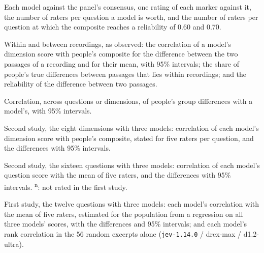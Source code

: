 \begin{table}[H]\centering
\caption{Each model against the panel's consensus, one rating of each marker against it, the number of raters
per question a model is worth, and the number of raters per question at which the composite reaches a
reliability of 0.60 and 0.70.}\label{tab:s2panel}

\end{table}

\begin{table}[H]\centering
\caption{Within and between recordings, as observed: the correlation of a model's dimension score with people's
composite for the difference between the two passages of a recording and for their mean, with 95\% intervals;
the share of people's true differences between passages that lies within recordings; and the reliability of
the difference between two passages.}\label{tab:s2within}

\end{table}

\begin{table}[H]\centering
\caption{Correlation, across questions or dimensions, of people's group differences with a model's, with 95\%
intervals.}\label{tab:s2groupsacross}

\end{table}

\begin{table}[H]\centering
\caption{Second study, the eight dimensions with three models: correlation of each model's dimension score with
people's composite, stated for five raters per question, and the differences with 95\% intervals.}\label{tab:s3dims}

\end{table}

\begin{table}[H]\centering
\caption{Second study, the sixteen questions with three models: correlation of each model's question score with
the mean of five raters, and the differences with 95\% intervals. \textsuperscript{n}: not rated in the first
study.}\label{tab:s3questions}

\end{table}

\begin{table}[H]\centering
\caption{First study, the twelve questions with three models: each model's correlation with the mean of five
raters, estimated for the population from a regression on all three models' scores, with the differences and
95\% intervals; and each model's rank correlation in the 56 random excerpts alone (\texttt{jev-1.14.0} /
drex-max / d1.2-ultra).}\label{tab:s3first}

\end{table}

